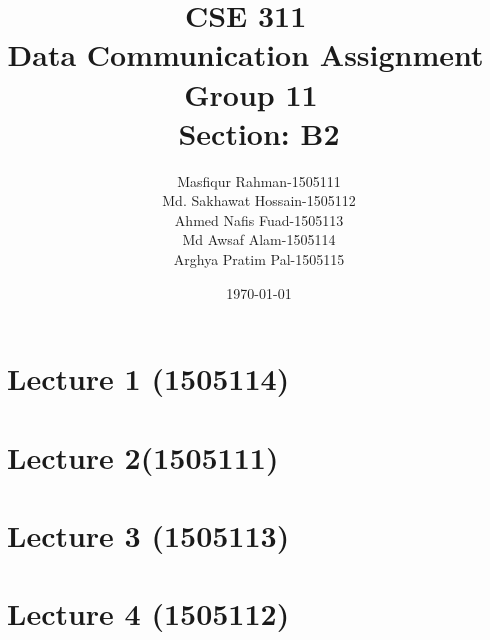 \documentclass{book}
\title{\textbf{CSE 311} ~\textbf{\\Data Communication Assignment} ~ \textbf{\\Group 11}~ \textbf{\\Section: B2}}
\author{Masfiqur Rahman-1505111\\
        Md. Sakhawat Hossain-1505112\\
        Ahmed Nafis Fuad-1505113\\
        Md Awsaf Alam-1505114\\
        Arghya Pratim Pal-1505115}
\date{\today}
\begin{document}
\maketitle

\tableofcontents

\chapter{Lecture 1 (1505114)}


\chapter{Lecture 2(1505111)}


\chapter{Lecture 3 (1505113)}


\chapter{Lecture 4 (1505112)}

\end{document}
